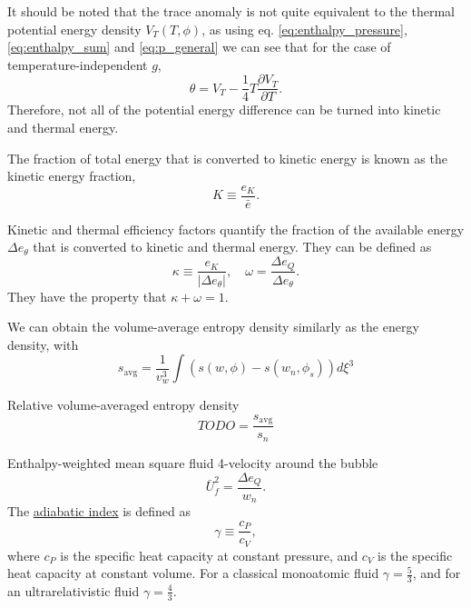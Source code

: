 It should be noted that the trace anomaly is not quite equivalent to the thermal potential energy density $V_T(T,\phi)$, as using eq. \eqref{eq:enthalpy_pressure}, \eqref{eq:enthalpy_sum} and \eqref{eq:p_general} we can see that for the case of temperature-independent $g$,
\begin{equation}
\theta = V_T - \frac{1}{4} T \frac{\partial V_T}{\partial T}.
\end{equation}
Therefore, not all of the potential energy difference can be turned into kinetic and thermal energy.
\cite[ch. B.2]{hindmarsh_gw_pt_2019}

The fraction of total energy that is converted to kinetic energy is known as the kinetic energy fraction,
\begin{equation}
K \equiv \frac{e_K}{\bar{e}}.
\end{equation}

Kinetic and thermal efficiency factors quantify the fraction of the available energy $\Delta e_\theta$ that is converted to kinetic and thermal energy.
They can be defined as
\begin{equation}
\kappa \equiv \frac{e_K}{| \Delta e_\theta |}, \quad
\omega = \frac{\Delta e_Q}{\Delta e_\theta}.
\end{equation}
They have the property that $\kappa + \omega = 1$.

We can obtain the volume-average entropy density similarly as the energy density, with
\begin{equation}
s_\text{avg} = \frac{1}{v_w^3} \int \left( s(w,\phi) - s(w_n, \phi_s) \right) d\xi^3
\end{equation}

Relative volume-averaged entropy density
\begin{equation}
TODO = \frac{s_\text{avg}}{s_n}
\end{equation}

Enthalpy-weighted mean square fluid 4-velocity around the bubble
\begin{equation}
\bar{U}_f^2 = \frac{\Delta e_Q}{w_n}.
\end{equation}
The \href{https://en.wikipedia.org/wiki/Heat_capacity_ratio}{adiabatic index} is defined as
\begin{equation}
\gamma \equiv \frac{c_P}{c_V},
\end{equation}
where $c_P$ is the specific heat capacity at constant pressure,
and $c_V$ is the specific heat capacity at constant volume.
For a classical monoatomic fluid $\gamma = \frac{5}{3}$,
and for an ultrarelativistic fluid $\gamma = \frac{4}{3}$.

